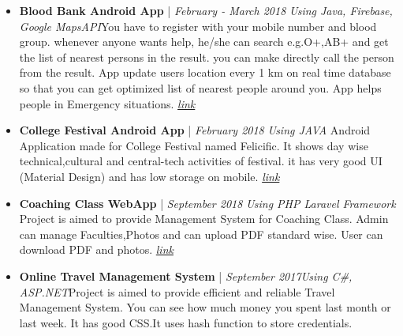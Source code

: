 \documentclass[11pt,a4paper,sans]{moderncv}        %
\begin{document}
\begin{itemize}

\item \textbf{Blood Bank Android App} | \textit{February - March 2018} \vspace{3pt}\newline\textit{Using Java, Firebase, Google MapsAPI}\vspace{4pt}\newline \small{You have to register with your mobile number and blood group. whenever anyone wants help, he/she can search e.g.O+,AB+ and get the list of nearest persons in the result. you can make directly call the person from the result. App update users location every 1 km on real time database so that you can get optimized list of nearest people around you. App helps people in Emergency situations.} \href{https://github.com/denishrana09/BloodBankApp}{\textit{link}}\vspace{6pt}

\item{\textbf{College Festival Android App} | \textit{February 2018} \vspace{3pt}\newline\textit{Using JAVA}
\vspace{4pt}\newline
\small{Android Application made for College Festival named Felicific. It shows day wise technical,cultural and central-tech activities of festival. it has very good UI (Material Design) and has low storage on mobile.}}
\href{https://play.google.com/store/apps/details?id=in.opensol.felicific}{\textit{link}}\vspace{6pt}

\item{\textbf{Coaching Class WebApp} | \textit{September 2018} \vspace{3pt}\newline\textit{Using PHP Laravel Framework}
\vspace{4pt}\newline
\small{Project is aimed to provide Management System for Coaching Class. Admin can manage Faculties,Photos and can
upload PDF standard wise. User can download PDF and photos.}}
\href{http://shreevidhyaclass.com/}{\textit{link}}\vspace{6pt}

\item \textbf{Online Travel Management System} | \textit{September 2017}\vspace{3pt}\newline\textit{Using C\#, ASP.NET}\vspace{4pt}\newline \small{Project is aimed to provide efficient and reliable Travel Management System. You can see how much money you spent last month or last week. It has good CSS.It uses hash function to store credentials.} 
\end{itemize}
\end{document}
